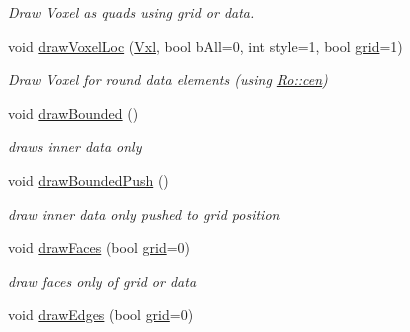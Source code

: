 \begin{DoxyCompactItemize}
\begin{DoxyCompactList}\small\item\em Draw Voxel as quads using grid or data. \end{DoxyCompactList}\item 
\hypertarget{classvsr_1_1_lattice_a535fd2d7e188cbb5eed0f8d43b30ee22}{void \hyperlink{classvsr_1_1_lattice_a535fd2d7e188cbb5eed0f8d43b30ee22}{draw\-Voxel\-Loc} (\hyperlink{classvsr_1_1_vxl}{Vxl}, bool b\-All=0, int style=1, bool \hyperlink{classvsr_1_1_lattice_a85532086719166cc74662088b0173a4c}{grid}=1)}\label{classvsr_1_1_lattice_a535fd2d7e188cbb5eed0f8d43b30ee22}

\begin{DoxyCompactList}\small\item\em Draw Voxel for round data elements (using \hyperlink{structvsr_1_1_ro_a29763a7a96a9d5c4bd081687e6ddf987}{Ro\-::cen}) \end{DoxyCompactList}\item 
\hypertarget{classvsr_1_1_lattice_a9d0443a84d293b5531655f01dd6bd445}{void \hyperlink{classvsr_1_1_lattice_a9d0443a84d293b5531655f01dd6bd445}{draw\-Bounded} ()}\label{classvsr_1_1_lattice_a9d0443a84d293b5531655f01dd6bd445}

\begin{DoxyCompactList}\small\item\em draws inner data only \end{DoxyCompactList}\item 
\hypertarget{classvsr_1_1_lattice_a47900306832a0dfb06d6d0acbce45a9f}{void \hyperlink{classvsr_1_1_lattice_a47900306832a0dfb06d6d0acbce45a9f}{draw\-Bounded\-Push} ()}\label{classvsr_1_1_lattice_a47900306832a0dfb06d6d0acbce45a9f}

\begin{DoxyCompactList}\small\item\em draw inner data only pushed to grid position \end{DoxyCompactList}\item 
\hypertarget{classvsr_1_1_lattice_ab9638aa17ea31ca483f846ceb4be6d3d}{void \hyperlink{classvsr_1_1_lattice_ab9638aa17ea31ca483f846ceb4be6d3d}{draw\-Faces} (bool \hyperlink{classvsr_1_1_lattice_a85532086719166cc74662088b0173a4c}{grid}=0)}\label{classvsr_1_1_lattice_ab9638aa17ea31ca483f846ceb4be6d3d}

\begin{DoxyCompactList}\small\item\em draw faces only of grid or data \end{DoxyCompactList}\item 
\hypertarget{classvsr_1_1_lattice_a8d5b3c583555a5c465859f7f8a8a2d48}{void \hyperlink{classvsr_1_1_lattice_a8d5b3c583555a5c465859f7f8a8a2d48}{draw\-Edges} (bool \hyperlink{classvsr_1_1_lattice_a85532086719166cc74662088b0173a4c}{grid}=0)}\label{classvsr_1_1_lattice_a8d5b3c583555a5c465859f7f8a8a2d48}


\end{DoxyCompactItemize}
